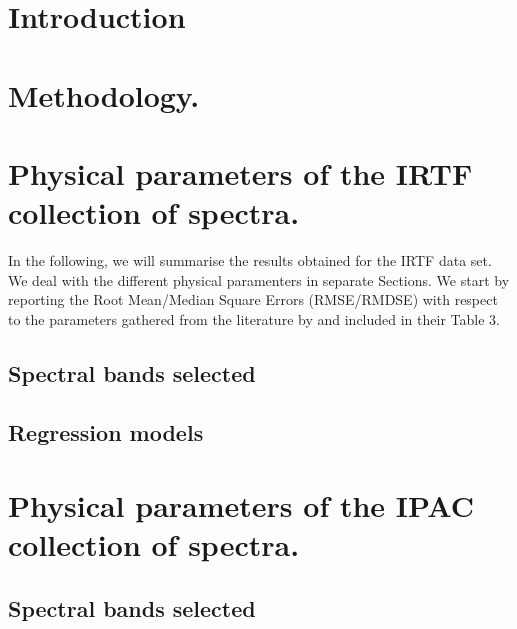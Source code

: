 \documentclass[printer]{aa}
\begin{document}
\section{Introduction}
\label{sec:intro}







\section{Methodology.}
\label{sec:meth}


\section{Physical parameters of the IRTF collection of spectra.}
\label{sec:irtf}

In the following, we will summarise the results obtained for the IRTF
data set. We deal with the different physical paramenters in separate
Sections. We start by reporting the Root Mean/Median Square Errors
(RMSE/RMDSE) with respect to the parameters gathered from the
literature by \cite{cesetti} and included in their Table 3.

\subsection{Spectral bands selected}

\subsection{Regression models}


\section{Physical parameters of the IPAC collection of spectra.}
\label{sec:ipac}

\subsection{Spectral bands selected}

\end{document}
